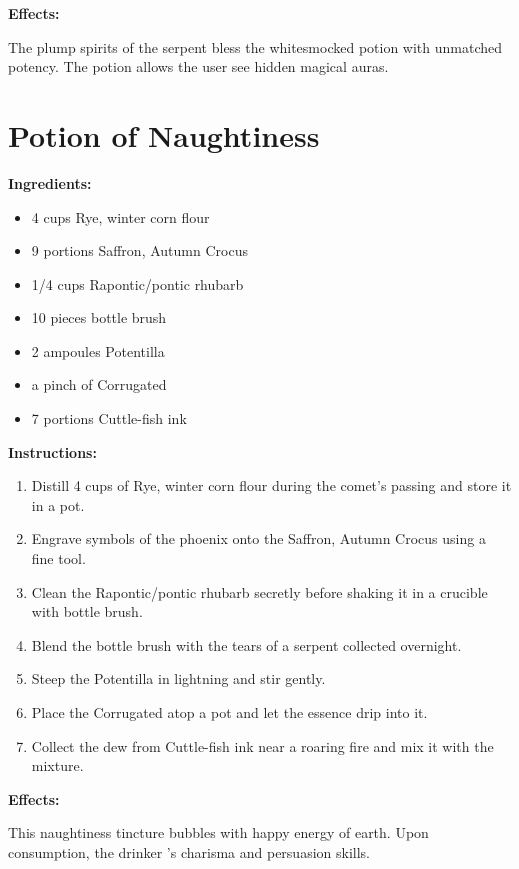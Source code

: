 \documentclass{article}
\begin{document}
\textbf{Effects:}

The plump spirits of the serpent bless the whitesmocked potion with unmatched potency. The potion allows the user see hidden magical auras.

\newpage
\section*{Potion of Naughtiness}

\textbf{Ingredients:}

\begin{itemize}
  \item 4 cups Rye, winter corn flour
  \item 9 portions Saffron, Autumn Crocus
  \item 1/4 cups Rapontic/pontic rhubarb
  \item 10 pieces bottle brush
  \item 2 ampoules Potentilla
  \item a pinch of Corrugated
  \item 7 portions Cuttle-fish ink
\end{itemize}

\textbf{Instructions:}

\begin{enumerate}
  \item Distill 4 cups of Rye, winter corn flour during the comet’s passing and store it in a pot.
  \item Engrave symbols of the phoenix onto the Saffron, Autumn Crocus using a fine tool.
  \item Clean the Rapontic/pontic rhubarb secretly before shaking it in a crucible with bottle brush.
  \item Blend the bottle brush with the tears of a serpent collected overnight.
  \item Steep the Potentilla in lightning and stir gently.
  \item Place the Corrugated atop a pot and let the essence drip into it.
  \item Collect the dew from Cuttle-fish ink near a roaring fire and mix it with the mixture.
\end{enumerate}

\textbf{Effects:}

This naughtiness tincture bubbles with happy energy of earth. Upon consumption, the drinker 's charisma and persuasion skills.
\end{document}
